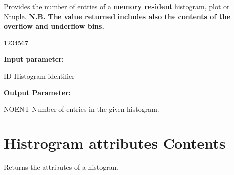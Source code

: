  
\Action
Provides the number of entries of a {\bf memory resident} histogram, 
plot or Ntuple. {\bf N.B. The value returned includes also the contents
of the overflow and underflow bins.}
 
\begin{DLtt}{1234567}
\item[{\rm\bf Input parameter:}]
\item[ID] Histogram identifier
\item[{\rm\bf Output Parameter:}]
\item[NOENT] Number of entries in the given histogram.
\end{DLtt}
 
\section{Histrogram attributes Contents}
\label{sec-HKIND}
 
 
\Action
Returns the attributes of a histogram
 
